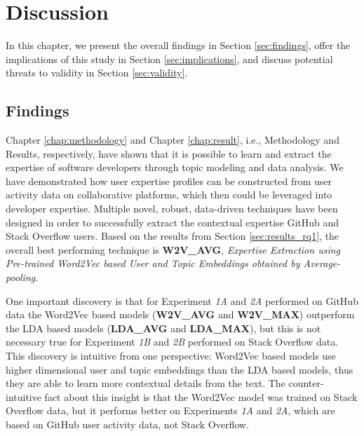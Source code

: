 \chapter{Discussion\label{chap:discussion}}

    In this chapter, we present the overall findings in Section \ref{sec:findings}, offer the implications of this study in Section \ref{sec:implications}, and discuss potential threats to validity in Section \ref{sec:validity}.
    
    \section{Findings\label{sec:findings}}
        Chapter \ref{chap:methodology} and Chapter \ref{chap:result}, i.e., Methodology and Results, respectively, have shown that it is possible to learn and extract the expertise of software developers through topic modeling and data analysis. We have demonstrated how user expertise profiles can be constructed from user activity data on collaborative platforms, which then could be leveraged into developer expertise. Multiple novel, robust, data-driven techniques have been designed in order to successfully extract the contextual expertise GitHub and Stack Overflow users. Based on the results from Section \ref{sec:results_rq1}, the overall best performing technique is \textbf{W2V\_AVG}, \emph{Expertise Extraction using Pre-trained Word2Vec based User and Topic Embeddings obtained by Average-pooling}. 
        
        One important discovery is that for Experiment \emph{1A} and \emph{2A} performed on GitHub data the Word2Vec based models (\textbf{W2V\_AVG} and \textbf{W2V\_MAX}) outperform the LDA based models (\textbf{LDA\_AVG} and \textbf{LDA\_MAX}), but this is not necessary true for Experiment \emph{1B} and \emph{2B} performed on Stack Overflow data. This discovery is intuitive from one perspective: Word2Vec based models use higher dimensional user and topic embeddings than the LDA based models, thus they are able to learn more contextual details from the text. The counter-intuitive fact about this insight is that the Word2Vec model was trained on Stack Overflow data, but it performs better on Experiments \emph{1A} and \emph{2A}, which are based on GitHub user activity data, not Stack Overflow. 
        
